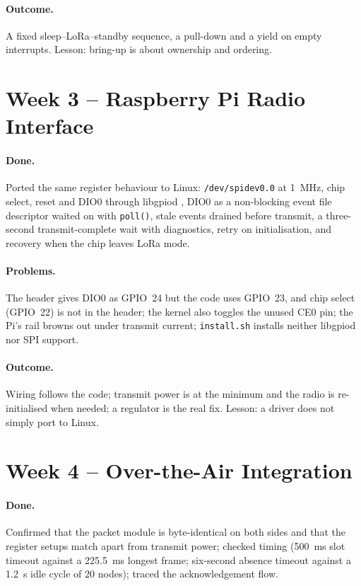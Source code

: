 \documentclass{tietreport}
\begin{document}
\paragraph{Outcome.} A fixed sleep--LoRa--standby sequence, a
pull-down and a yield on empty interrupts. Lesson: bring-up is about
ownership and ordering.

\section{Week 3 -- Raspberry Pi Radio Interface}

\paragraph{Done.} Ported the same register behaviour to Linux:
\texttt{/dev/spidev0.0} at 1~MHz, chip select, reset and DIO0 through
libgpiod \cite{libgpiod,spidevdocs}, DIO0 as a non-blocking event file
descriptor waited on with \texttt{poll()}, stale events drained before
transmit, a three-second transmit-complete wait with diagnostics,
retry on initialisation, and recovery when the chip leaves LoRa mode.

\paragraph{Problems.} The header gives DIO0 as GPIO~24 but the code
uses GPIO~23, and chip select (GPIO~22) is not in the header; the
kernel also toggles the unused CE0 pin; the Pi's rail browns out
under transmit current; \texttt{install.sh} installs neither libgpiod
nor SPI support.

\paragraph{Outcome.} Wiring follows the code; transmit power is at
the minimum and the radio is re-initialised when needed; a regulator
is the real fix. Lesson: a driver does not simply port to Linux.

\section{Week 4 -- Over-the-Air Integration}

\paragraph{Done.} Confirmed that the packet module is byte-identical
on both sides and that the register setups match apart from transmit
power; checked timing (500~ms slot timeout against a 225.5~ms longest
frame; six-second absence timeout against a 1.2~s idle cycle of 20
nodes); traced the acknowledgement flow.
\end{document}

